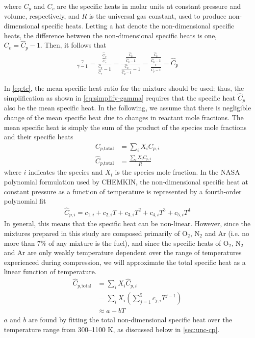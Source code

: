 \documentclass[12pt, letterpaper]{article}
\begin{document}
where $C_p$ and $C_v$ are the specific heats in molar units at constant
pressure and volume, respectively, and $R$ is the universal gas constant,
used to produce non-dimensional specific heats. Letting a hat denote the
non-dimensional specific heats, the difference between the non-dimensional
specific heats is one, $\hat{C}_v = \hat{C}_p - 1$. Then, it follows that
%
\begin{align}
\label{eq:simplify-gamma}
\frac{\gamma}{\gamma - 1} = \frac{\frac{\hat{C}_p}{\hat{C}_v}}{\frac{\hat{C}_p}{\hat{C}_v} - 1}
= \frac{\frac{\hat{C}_p}{\hat{C}_p - 1}}{\frac{\hat{C}_p}{\hat{C}_p - 1} - 1}
= \frac{\frac{\hat{C}_p}{\hat{C}_p - 1}}{\frac{1}{\hat{C}_p - 1}}
= \hat{C}_p
\end{align}

In \autoref{eq:tc}, the mean specific heat ratio for the mixture
should be used; thus, the simplification as shown in \autoref{eq:simplify-gamma}
requires that the specific heat $\hat{C}_p$ also be the mean specific
heat. In the following, we assume that there is negligible
change of the mean specific heat due to changes in reactant
mole fractions. The mean specific heat is simply the sum of the product of
the species mole fractions and their specific heats
%
\begin{subequations}
\label{eq:cp}
\begin{align}
C_{p\text{,total}} &= \sum_i X_i C_{p,i} \\
\hat{C}_{p\text{,total}} &= \frac{\sum_i X_i C_{p,i}}{R}
\end{align}
\end{subequations}
%
where $i$ indicates the species and $X_i$ is the species mole fraction.
In the NASA polynomial formulation used by CHEMKIN, the non-dimensional specific
heat at constant pressure as a function of temperature is represented by a
fourth-order polynomial fit
%
\begin{align}
\hat{C}_{p,i} = c_{1,i} + c_{2,i} T + c_{3,i} T^2 + c_{4,i} T^3 + c_{5,i} T^4
\end{align}
%
In general, this means that the specific heat can be non-linear. However,
since the mixtures prepared in this study are composed primarily of
O$_2$, N$_2$ and Ar (i.e. no more than 7\% of any mixture is the
fuel), and since the specific heats of O$_2$, N$_2$ and Ar are only weakly
temperature dependent over the range of temperatures experienced during
compression, we will approximate the total specific heat as a linear function
of temperature.
%
\begin{equation}%
\label{eq:cp-total}
\begin{split}
\hat{C}_{p\text{,total}} &= \sum_i X_i \hat{C}_{p,i} \\
&= \sum_i X_i \left( \sum_{j=1}^5 c_{j,i} T^{j-1} \right) \\
&\approx a + b T
\end{split}
\end{equation}
%
$a$ and $b$ are found by fitting the total non-dimensional specific heat
over the temperature range from 300--1100 K, as discussed below in
\autoref{sec:unc-cp}.
\end{document}
